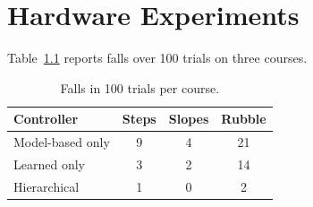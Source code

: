 \chapter{Hardware Experiments}
\label{ch:results}

Table~\ref{tab:falls} reports falls over 100 trials on three courses.

\begin{table}[htbp]
  \centering
  \caption{Falls in 100 trials per course.}
  \label{tab:falls}
  \begin{tabular}{lccc}
    \toprule
    Controller & Steps & Slopes & Rubble \\
    \midrule
    Model-based only  & 9 & 4 & 21 \\
    Learned only      & 3 & 2 & 14 \\
    Hierarchical      & 1 & 0 & 2 \\
    \bottomrule
  \end{tabular}
\end{table}
